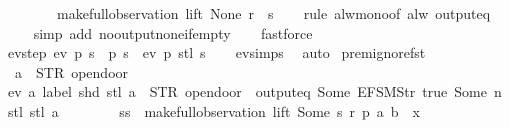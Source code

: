 \begin{isabellebody}
\ \ \ \ \ \ \ \ {\isacharparenleft}make{\isacharunderscore}full{\isacharunderscore}observation\ lift\ None\ r\ {\isacharbrackleft}{\isacharbrackright}\ s{\isacharparenright}{\isachardoublequoteclose}\isanewline
%
\isadelimproof
\ \ %
\endisadelimproof
%
\isatagproof
{}\isamarkupfalse%
\ {\isacharparenleft}rule\ alw{\isacharunderscore}mono{\isacharbrackleft}of\ {\isachardoublequoteopen}alw\ {\isacharparenleft}output{\isacharunderscore}eq\ {\isacharbrackleft}{\isacharbrackright}{\isacharparenright}{\isachardoublequoteclose}{\isacharbrackright}{\isacharparenright}\isanewline
\ \ \ \isamarkupfalse%
\ {\isacharparenleft}simp\ add{\isacharcolon}\ no{\isacharunderscore}output{\isacharunderscore}none{\isacharunderscore}if{\isacharunderscore}empty{\isacharparenright}\isanewline
\ \ \isamarkupfalse%
\ fastforce%
\endisatagproof
{\isafoldproof}%
%
\isadelimproof
\isanewline
%
\endisadelimproof
\isanewline
{}\isamarkupfalse%
\ ev{\isacharunderscore}step{\isacharcolon}\ {\isachardoublequoteopen}ev\ p\ s\ {\isacharequal}\ p\ s\ {\isasymor}\ ev\ p\ {\isacharparenleft}stl\ s{\isacharparenright}{\isachardoublequoteclose}\isanewline
%
\isadelimproof
\ \ %
\endisadelimproof
%
\isatagproof
{}\isamarkupfalse%
\ ev{\isachardot}simps\ \isamarkupfalse%
\ auto%
\endisatagproof
{\isafoldproof}%
%
\isadelimproof
\isanewline
%
\endisadelimproof
\isanewline
{}\isamarkupfalse%
\ prem{\isacharunderscore}ignore{\isacharunderscore}fst{\isacharcolon}\isanewline
\ \ {\isachardoublequoteopen}a\ {\isasymnoteq}\ STR\ {\isacharprime}{\isacharprime}opendoor{\isacharprime}{\isacharprime}\ {\isasymLongrightarrow}\isanewline
\ ev\ {\isacharparenleft}{\isasymlambda}a{\isachardot}\ label\ {\isacharparenleft}shd\ {\isacharparenleft}stl\ a{\isacharparenright}{\isacharparenright}\ {\isacharequal}\ STR\ {\isacharprime}{\isacharprime}opendoor{\isacharprime}{\isacharprime}\ {\isasymand}\ output{\isacharunderscore}eq\ {\isacharbrackleft}Some\ {\isacharparenleft}EFSM{\isachardot}Str\ {\isacharprime}{\isacharprime}true{\isacharprime}{\isacharprime}{\isacharparenright}{\isacharcomma}\ Some\ n{\isacharbrackright}\ {\isacharparenleft}stl\ {\isacharparenleft}stl\ a{\isacharparenright}{\isacharparenright}{\isacharparenright}\isanewline
\ \ \ \ \ \ \ \ {\isacharparenleft}ss\ {\isacharhash}{\isacharhash}\ make{\isacharunderscore}full{\isacharunderscore}observation\ lift\ {\isacharparenleft}Some\ s{\isacharprime}{\isacharparenright}\ r{\isacharprime}\ p{\isacharprime}\ {\isacharparenleft}{\isacharparenleft}a{\isacharcomma}\ b{\isacharparenright}\ {\isacharhash}{\isacharhash}\ x{}{\isacharparenright}{\isacharparenright}\ {\isacharequal}\isanewline

\end{isabellebody}
